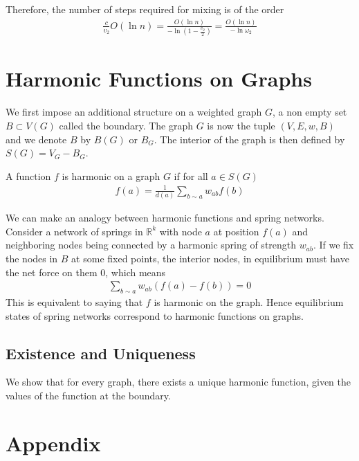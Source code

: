 \documentclass{math}
\begin{document}
Therefore, the number of steps required for mixing is of the order
\begin{align*}
    \frac{c}{v_2}O(\ln{n}) = \frac{O(\ln{n})}{-\ln\left(1 - \frac{v_2}{2}\right)} = \frac{O(\ln{n})}{-\ln{\omega_2}}
\end{align*}

\section{Harmonic Functions on Graphs}

We first impose an additional structure on a weighted graph $G$, a non empty set $B \subset V(G)$ called the boundary.
The graph $G$ is now the tuple $(V, E, w, B)$ and we denote $B$ by $B(G)$ or $B_G$. The interior of the graph is then defined by $S(G) = V_G - B_G$.

\begin{definition}
    A function $f$ is harmonic on a graph $G$ if for all $a \in S(G)$
    \begin{align*}
        f(a) = \frac{1}{d(a)} \sum_{b \sim a} w_{ab}f(b)
    \end{align*}
\end{definition}

We can make an analogy between harmonic functions and spring networks. Consider a network of springs in $\mathbb{R}^k$
with node $a$ at position $f(a)$ and neighboring nodes being connected by a harmonic spring of strength $w_{ab}$.
If we fix the nodes in $B$ at some fixed points, the interior nodes, in equilibrium must have the net force on them $0$, which means
\begin{align*}
    \sum_{b \sim a} w_{ab}(f(a) - f(b)) = 0
\end{align*}
This is equivalent to saying that $f$ is harmonic on the graph.
Hence equilibrium states of spring networks correspond to harmonic functions on graphs.

\subsection{Existence and Uniqueness}

We show that for every graph, there exists a unique harmonic function, given the values of the function at the boundary.

\section{Appendix}
\end{document}
